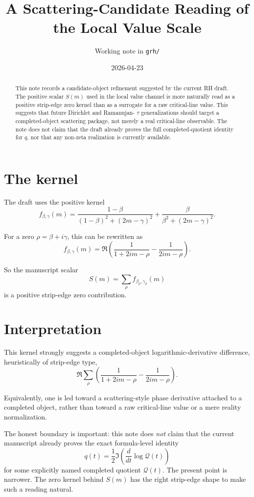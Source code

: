 \documentclass[11pt]{article}
\title{A Scattering-Candidate Reading of the Local Value Scale}
\author{Working note in \texttt{grh/}}
\date{2026-04-23}
\begin{document}
\maketitle

\begin{abstract}
This note records a candidate-object refinement suggested by the current RH
draft. The positive scalar \(S(m)\) used in the local value channel is more
naturally read as a positive strip-edge zero kernel than as a surrogate for a
raw critical-line value. This suggests that future Dirichlet and Ramanujan-
\(\tau\) generalizations should target a completed-object scattering package,
not merely a real critical-line observable. The note does not claim that the
draft already proves the full completed-quotient identity for \(q\), nor that
any non-zeta realization is currently available.
\end{abstract}

\section{The kernel}

The draft uses the positive kernel
\[
f_{\beta,\gamma}(m)=
\frac{1-\beta}{(1-\beta)^2+(2m-\gamma)^2}
+
\frac{\beta}{\beta^2+(2m-\gamma)^2}.
\]

For a zero \(\rho=\beta+i\gamma\), this can be rewritten as
\[
f_{\beta,\gamma}(m)
=
\Re\left(\frac{1}{1+2im-\rho}-\frac{1}{2im-\rho}\right).
\]

So the manuscript scalar
\[
S(m)=\sum_\rho f_{\beta_\rho,\gamma_\rho}(m)
\]
is a positive strip-edge zero contribution.

\section{Interpretation}

This kernel strongly suggests a completed-object logarithmic-derivative
difference, heuristically of strip-edge type,
\[
\Re\sum_\rho\left(\frac{1}{1+2im-\rho}-\frac{1}{2im-\rho}\right).
\]

Equivalently, one is led toward a scattering-style phase derivative attached to
a completed object, rather than toward a raw critical-line value or a mere
reality normalization.

The honest boundary is important: this note does \emph{not} claim that the
current manuscript already proves the exact formula-level identity
\[
q(t)=\frac12\Im\left(\frac{d}{dt}\log \mathcal Q(t)\right)
\]
for some explicitly named completed quotient \(\mathcal Q(t)\). The present
point is narrower. The zero kernel behind \(S(m)\) has the right strip-edge
shape to make such a reading natural.
\end{document}
